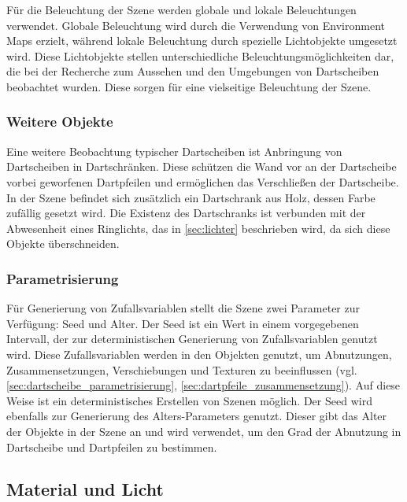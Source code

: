 Für die Beleuchtung der Szene werden globale und lokale Beleuchtungen verwendet. Globale Beleuchtung wird durch die Verwendung von Environment Maps erzielt, während lokale Beleuchtung durch spezielle Lichtobjekte umgesetzt wird. Diese Lichtobjekte stellen unterschiedliche Beleuchtungsmöglichkeiten dar, die bei der Recherche zum Aussehen und den Umgebungen von Dartscheiben beobachtet wurden. Diese sorgen für eine vielseitige Beleuchtung der Szene.

\subsubsection{Weitere Objekte}
\label{sec:weitere_objekte}

Eine weitere Beobachtung typischer Dartscheiben ist Anbringung von Dartscheiben in Dartschränken. Diese schützen die Wand vor an der Dartscheibe vorbei geworfenen Dartpfeilen und ermöglichen das Verschließen der Dartscheibe. In der Szene befindet sich zusätzlich ein Dartschrank aus Holz, dessen Farbe zufällig gesetzt wird. Die Existenz des Dartschranks ist verbunden mit der Abwesenheit eines Ringlichts, das in \autoref{sec:lichter} beschrieben wird, da sich diese Objekte überschneiden.

\subsubsection{Parametrisierung}
\label{sec:parameter}

Für Generierung von Zufallsvariablen stellt die Szene zwei Parameter zur Verfügung: Seed und Alter. Der Seed ist ein Wert in einem vorgegebenen Intervall, der zur deterministischen Generierung von Zufallsvariablen genutzt wird. Diese Zufallsvariablen werden in den Objekten genutzt, um Abnutzungen, Zusammensetzungen, Verschiebungen und Texturen zu beeinflussen (vgl. \autoref{sec:dartscheibe_parametrisierung}, \autoref{sec:dartpfeile_zusammensetzung}). Auf diese Weise ist ein deterministisches Erstellen von Szenen möglich. Der Seed wird ebenfalls zur Generierung des Alters-Parameters genutzt. Dieser gibt das Alter der Objekte in der Szene an und wird verwendet, um den Grad der Abnutzung in Dartscheibe und Dartpfeilen zu bestimmen.


\subsection{Material und Licht}  %
\label{sec:material_licht}

